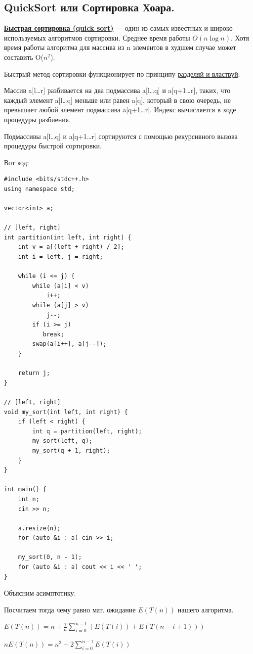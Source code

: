 \documentclass{article}
\newcommand{\deff}[1]{\underline{\textbf{#1}}}
\begin{document}
\subsection*{QuickSort или Сортировка Хоара.}

\deff{Быстрая сортировка (quick sort)} — один из самых известных и широко используемых алгоритмов сортировки. Среднее время работы $O(n \log n)$. Хотя время работы алгоритма для массива из n элементов в худшем случае может составить O($n^2$).

Быстрый метод сортировки функционирует по принципу \uline{разделяй и властвуй}:

Массив a[l…r] разбивается на два подмассива a[l…q] и a[q+1…r], таких, что каждый элемент a[l…q] меньше или равен a[q], который в свою очередь, не превышает любой элемент подмассива a[q+1…r]. Индекс вычисляется в ходе процедуры разбиения.

Подмассивы a[l…q] и a[q+1…r] сортируются с помощью рекурсивного вызова процедуры быстрой сортировки.

Вот код:
\begin{lstlisting}[mathescape]
#include <bits/stdc++.h>
using namespace std;

vector<int> a;

// [left, right]
int partition(int left, int right) {
    int v = a[(left + right) / 2];
    int i = left, j = right;
    
    while (i <= j) { 
        while (a[i] < v)
            i++;
        while (a[j] > v)
            j--;
        if (i >= j) 
           break;
        swap(a[i++], a[j--]);
    }
    
    return j;
}

// [left, right]
void my_sort(int left, int right) {
    if (left < right) {
        int q = partition(left, right);
        my_sort(left, q);
        my_sort(q + 1, right);
    }
}

int main() {
    int n;
    cin >> n;
    
    a.resize(n);
    for (auto &i : a) cin >> i;
    
    my_sort(0, n - 1);
    for (auto &i : a) cout << i << ' ';
}
 \end{lstlisting}

Объясним асимптотику:

Посчитаем тогда чему равно мат. ожидание $E(T(n))$ нашего алгоритма. 

$E(T(n)) = n + \frac{1}{n}\sum\limits_{i=0}^{n-1}(E(T(i)) + E(T(n-i+1)))$ 

$n E(T(n)) = n^2 + 2 \sum\limits_{i=0}^{n-1} E(T(i))$
\end{document}

